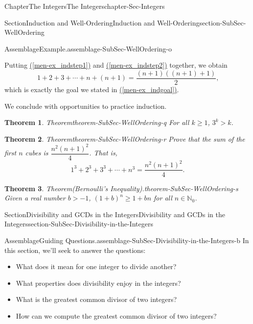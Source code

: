 \documentclass[oneside,10pt,]{book}
\newcommand{\xreffont}{\relax}
\numberwithin{equation}{section}
\renewcommand{\ge}{\geqslant}
\def\N{{\mathbb N}}
\newtheorem{theorem}{Theorem}[section]
\begin{document}
\begin{chapterptx}{Chapter}{The Integers}{}{The Integers}{}{}{chapter-Sec-Integers}
\begin{sectionptx}{Section}{Induction and Well-Ordering}{}{Induction and Well-Ordering}{}{}{section-SubSec-WellOrdering}
\begin{assemblage}{Assemblage}{Example.}{assemblage-SubSec-WellOrdering-o}
\begin{equation}
\end{equation}
%
\par
Putting \hyperref[men-ex_indstep1]{({\xreffont\ref{men-ex_indstep1}})} and \hyperref[men-ex_indstep2]{({\xreffont\ref{men-ex_indstep2}})} together, we obtain%
\begin{equation*}
1+ 2 + 3 + \cdots + n + (n+1) = \frac{(n+1)((n+1)+1)}{2}\text{,}
\end{equation*}
which is exactly the goal we stated in \hyperref[men-ex_indgoal]{({\xreffont\ref{men-ex_indgoal}})}.%
\end{assemblage}
We conclude with opportunities to practice induction.%
\begin{theorem}{Theorem}{}{}{theorem-SubSec-WellOrdering-q}%
For all \(k\ge 1\), \(3^k > k\).%
\end{theorem}
\begin{theorem}{Theorem}{}{}{theorem-SubSec-WellOrdering-r}%
Prove that the sum of the first \(n\) cubes is \(\dfrac{n^2(n+1)^2}{4}\). That is,%
%
\begin{equation*}
1^3 + 2^3 + 3^3 + \cdots + n^3 = \dfrac{n^2(n+1)^2}{4}.
\end{equation*}
\end{theorem}
\begin{theorem}{Theorem}{(Bernoulli's Inequality).}{}{theorem-SubSec-WellOrdering-s}%
Given a real number \(b > -1\), \((1+b)^n \ge 1 + bn\) for all \(n\in \N_0\).\end{theorem}
\end{sectionptx}
%
%
\typeout{************************************************}
\typeout{************************************************}
%
\begin{sectionptx}{Section}{Divisibility and GCDs in the Integers}{}{Divisibility and GCDs in the Integers}{}{}{section-SubSec-Divisibility-in-the-Integers}
\begin{assemblage}{Assemblage}{Guiding Questions.}{assemblage-SubSec-Divisibility-in-the-Integers-b}%
In this section, we'll seek to answer the questions: %
\begin{itemize}[label=\textbullet]
\item{}What does it mean for one integer to divide another?%
\item{}What properties does divisibility enjoy in the integers?%
\item{}What is the greatest common divisor of two integers?%
\item{}How can we compute the greatest common divisor of two integers?%

\end{itemize}
\end{assemblage}
\end{sectionptx}
\end{chapterptx}
\end{document}
